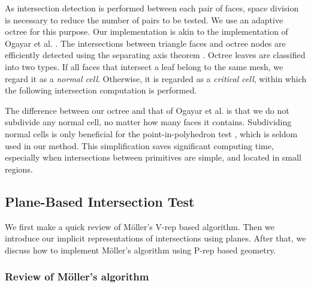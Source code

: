 As intersection detection is performed between each pair of faces, space division is necessary to reduce the number of pairs to be tested. We use an adaptive octree for this purpose. Our implementation is akin to the implementation of Ogayar et al. \cite{ogayar2015deferred}. The intersections between triangle faces and octree nodes are efficiently detected using the separating axis theorem \cite{gottschalk1996obbtree}. Octree leaves are classified into two types. If all faces that intersect a leaf belong to the same mesh, we regard it as a \emph{normal cell}. Otherwise, it is regarded as a \emph{critical cell}, within which the following intersection computation is performed.


The difference between our octree and that of Ogayar et al. is that we do not subdivide any normal cell, no matter how many faces it contains. Subdividing normal cells is only beneficial for the point-in-polyhedron test \cite{frisken2002simple}, which is seldom used in our method. This simplification saves significant computing time, especially when intersections between primitives are simple, and located in small regions.

\subsection{Plane-Based Intersection Test}

We first make a quick review of M\"{o}ller's V-rep based algorithm. Then we introduce our implicit representations of intersections using planes. After that, we discuss how to implement  M\"{o}ller's algorithm using P-rep based geometry.

\subsubsection{Review of M\"{o}ller's algorithm}



